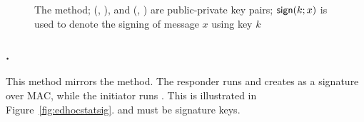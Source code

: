 \begin{figure}[h]
{}
    \caption{The \mSigStat{} method; (\mCredi{}, \mLtki), and
        (\mCredr{}, \mLtkr{}) are public-private key pairs; $\textsf{sign}(k; x)$ is
    used to denote the signing of message $x$ using key $k$}
\label{fig:edhocsigstat}
\end{figure}

\spacehack
\subsubsection{\mStatSig.}
This method mirrors the \mSigStat{} method.
%
The responder runs \mSig{} and creates \mAuthr{} as a signature over MAC,
while the initiator runs \mStat{}.
%
This is illustrated in Figure~\ref{fig:edhocstatsig}. \mCredr{} and \mLtkr{}
must be signature keys.
%


